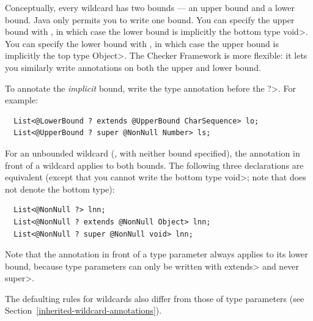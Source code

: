 Conceptually, every wildcard has two bounds --- an upper bound and a lower
bound.  Java only permits you to write one bound.
You can specify the upper bound with , in which
case the lower bound is implicitly the bottom type \<void>.
You can specify the lower bound with , in
which case the upper bound is implicitly the top type \<Object>.
The Checker Framework is more flexible:  it lets you similarly write
annotations on both the upper and lower bound.

To annotate the \emph{implicit} bound, write the type annotation
before the \<?>.  For example:

\begin{Verbatim}
  List<@LowerBound ? extends @UpperBound CharSequence> lo;
  List<@UpperBound ? super @NonNull Number> ls;
\end{Verbatim}

For an unbounded wildcard (, with neither
bound specified), the annotation in front of a wildcard applies
to both bounds.  The following three declarations are equivalent (except
that you cannot write the bottom type \<void>; note that
 does not denote the bottom type):

\begin{Verbatim}
  List<@NonNull ?> lnn;
  List<@NonNull ? extends @NonNull Object> lnn;
  List<@NonNull ? super @NonNull void> lnn;
\end{Verbatim}

\noindent
Note that the annotation in front of a type parameter always applies to its
lower bound, because type parameters can only be written with \<extends>
and never \<super>.



The defaulting rules for
wildcards also differ from those of type parameters (see
Section~\ref{inherited-wildcard-annotations}).


%
%
%
%


